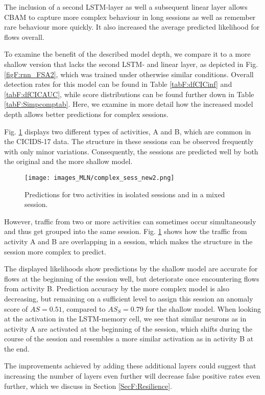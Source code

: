 The inclusion of a second LSTM-layer as well a subsequent linear layer allows CBAM to capture more complex behaviour in long sessions as well as remember rare behaviour more quickly. It also increased the average predicted likelihood for flows overall. 

To examine the benefit of the described model depth, we compare it to a more shallow version that lacks the second LSTM- and linear layer, as depicted in Fig. \ref{figF:rnn_FSA2}, which was trained under otherwise similar conditions. Overall detection rates for this model can be found in Table \ref{tabF:dfCICinf} and \ref{tabF:dfCICAUC}, while score distributions can be found  further down in Table \ref{tabF:Simpcomptab}. Here, we examine in more detail how the increased model depth allows better predictions for complex sessions. 

Fig. \ref{figF:complex_sess} displays two different types of activities, A and B, which are common in the CICIDS-17 data. The structure in these sessions can be observed frequently with only minor variations. Consequently, the sessions are predicted well by both the original and the more shallow model.
\begin{figure}[!ht]
\centering
\texttt{[image: images\_MLN/complex\_sess\_new2.png]} \caption{Predictions for two activities in isolated sessions and in a mixed session.}\label{figF:complex_sess}
\end{figure}

However, traffic from two or more activities can sometimes occur simultaneously and thus get grouped into the same session. Fig. \ref{figF:complex_sess} shows how the traffic from activity A and B are overlapping in a session, which makes the structure in the session more complex to predict.



The displayed likelihoods show predictions by the shallow model are accurate for flows at the beginning of the session well, but deteriorate once encountering flows from activity B. Prediction accuracy by the more complex model is also decreasing, but remaining on a sufficient level to assign this session an anomaly score of $AS=0.51$, compared to $AS_S=0.79$ for the shallow model. When looking at the activation in the LSTM-memory cell, we see that similar neurons as in activity A are activated at the beginning of the session, which shifts during the course of the session and resembles a more similar activation as in activity B at the end.

The improvements achieved by adding these additional layers could suggest that increasing the number of layers even further will decrease false positive rates even further, which we discuss in Section \ref{SecF:Resilience}.

